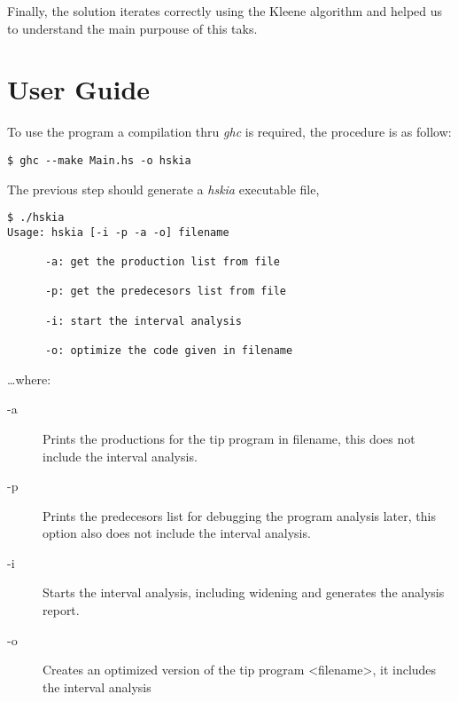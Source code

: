 \documentclass{article}
\begin{document}
Finally, the solution iterates correctly using the Kleene algorithm and helped us to understand the main purpouse of this taks.

% 
% 


\section{User Guide}
To use the program a compilation thru \emph{ghc} is required, the procedure is as follow:
\begin{verbatim}
$ ghc --make Main.hs -o hskia
\end{verbatim}

The previous step should generate a \emph{hskia} executable file,
\begin{verbatim}
$ ./hskia 
Usage: hskia [-i -p -a -o] filename

      -a: get the production list from file

      -p: get the predecesors list from file

      -i: start the interval analysis
      
      -o: optimize the code given in filename 
\end{verbatim}

\ldots where:
\begin{description}
  \item[-a] Prints the productions for the tip program in filename, this does not include the interval analysis.
  \item[-p] Prints the predecesors list for debugging the program analysis later, this option also does not include the interval analysis. 
  \item[-i] Starts the interval analysis, including widening and generates the analysis report.
  \item[-o] Creates an optimized version of the tip program <filename>, it includes the interval analysis 
\end{description}
\end{document}
